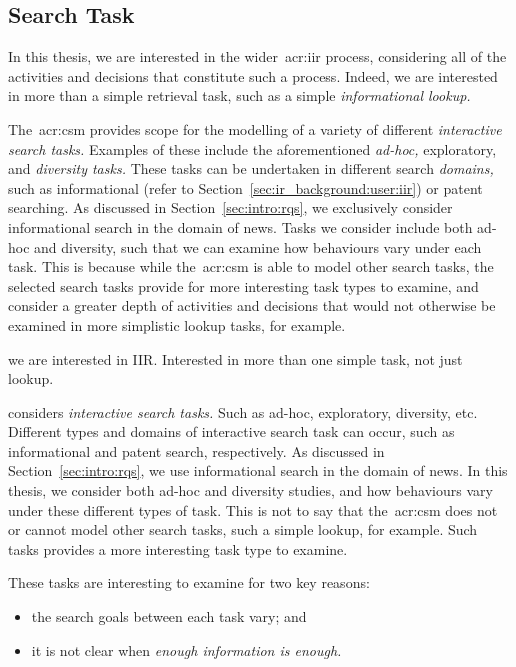 \subsection{Search Task}\label{sec:csm:assumptions:task}
In this thesis, we are interested in the wider~\gls{acr:iir} process, considering all of the activities and decisions that constitute such a process. Indeed, we are interested in more than a simple retrieval task, such as a simple \emph{informational lookup.}

The~\gls{acr:csm} provides scope for the modelling of a variety of different \emph{interactive search tasks.} Examples of these include the aforementioned \emph{ad-hoc,} exploratory, and \emph{diversity tasks.} These tasks can be undertaken in different search \emph{domains,} such as informational (refer to Section~\ref{sec:ir_background:user:iir}) or patent searching. As discussed in Section~\ref{sec:intro:rqs}, we exclusively consider informational search in the domain of news. Tasks we consider include both ad-hoc and diversity, such that we can examine how behaviours vary under each task. This is because while the~\gls{acr:csm} is able to model other search tasks, the selected search tasks provide for more interesting task types to examine, and consider a greater depth of activities and decisions that would not otherwise be examined in more simplistic lookup tasks, for example.

we are interested in IIR. Interested in more than one simple task, not just lookup.

considers \emph{interactive search tasks.} Such as ad-hoc, exploratory, diversity, etc. Different types and domains of interactive search task can occur, such as informational and patent search, respectively. As discussed in Section~\ref{sec:intro:rqs}, we use informational search in the domain of news. In this thesis, we consider both ad-hoc and diversity studies, and how behaviours vary under these different types of task. This is not to say that the~\gls{acr:csm} does not or cannot model other search tasks, such a simple lookup, for example. Such tasks provides a more interesting task type to examine.

These tasks are interesting to examine for two key reasons:

\begin{itemize}
    \item{the search goals between each task vary; and}
    \item{it is not clear when \emph{enough information is enough.}}
\end{itemize}

